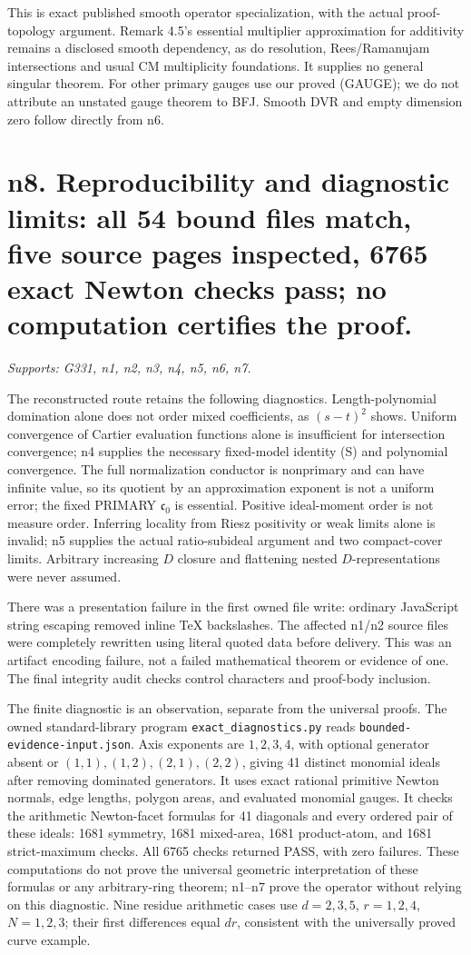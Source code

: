 \documentclass[11pt]{article}
\begin{document}
This is exact published smooth operator specialization, with the actual proof-topology argument. Remark 4.5's essential multiplier approximation for additivity remains a disclosed smooth dependency, as do resolution, Rees/Ramanujam intersections and usual CM multiplicity foundations. It supplies no general singular theorem. For other primary gauges use our proved (GAUGE); we do not attribute an unstated gauge theorem to BFJ. Smooth DVR and empty dimension zero follow directly from n6.

\section{n8. Reproducibility and diagnostic limits: all 54 bound files match, five source pages inspected, 6765 exact Newton checks pass; no computation certifies the proof.}
\textit{Supports: G331, n1, n2, n3, n4, n5, n6, n7.}

The reconstructed route retains the following diagnostics. Length-polynomial domination alone does not order mixed coefficients, as \((s-t)^2\) shows. Uniform convergence of Cartier evaluation functions alone is insufficient for intersection convergence; n4 supplies the necessary fixed-model identity (S) and polynomial convergence. The full normalization conductor is nonprimary and can have infinite value, so its quotient by an approximation exponent is not a uniform error; the fixed PRIMARY \(\mathfrak c_0\) is essential. Positive ideal-moment order is not measure order. Inferring locality from Riesz positivity or weak limits alone is invalid; n5 supplies the actual ratio-subideal argument and two compact-cover limits. Arbitrary increasing \(D\) closure and flattening nested \(D\)-representations were never assumed.

There was a presentation failure in the first owned file write: ordinary JavaScript string escaping removed inline TeX backslashes. The affected n1/n2 source files were completely rewritten using literal quoted data before delivery. This was an artifact encoding failure, not a failed mathematical theorem or evidence of one. The final integrity audit checks control characters and proof-body inclusion.

The finite diagnostic is an observation, separate from the universal proofs. The owned standard-library program \texttt{exact\_diagnostics.py} reads \texttt{bounded-evidence-input.json}. Axis exponents are \(1,2,3,4\), with optional generator absent or \((1,1),(1,2),(2,1),(2,2)\), giving 41 distinct monomial ideals after removing dominated generators. It uses exact rational primitive Newton normals, edge lengths, polygon areas, and evaluated monomial gauges. It checks the arithmetic Newton-facet formulas for 41 diagonals and every ordered pair of these ideals: 1681 symmetry, 1681 mixed-area, 1681 product-atom, and 1681 strict-maximum checks. All 6765 checks returned PASS, with zero failures. These computations do not prove the universal geometric interpretation of these formulas or any arbitrary-ring theorem; n1--n7 prove the operator without relying on this diagnostic. Nine residue arithmetic cases use \(d=2,3,5\), \(r=1,2,4\), \(N=1,2,3\); their first differences equal \(dr\), consistent with the universally proved curve example.
\end{document}
